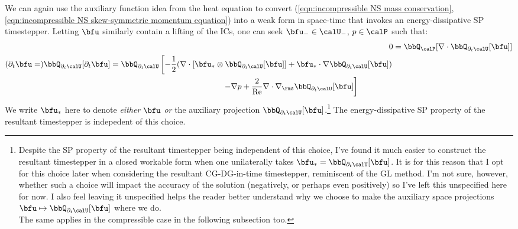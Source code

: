     We can again use the auxiliary function idea from the heat equation to convert (\ref{eqn:incompressible NS mass conservation}, \ref{eqn:incompressible NS skew-symmetric momentum equation}) into a weak form in space-time that invokes an energy-dissipative SP timestepper. Letting $\bfu$ similarly contain a lifting of the ICs, one can seek $\bfu_{-} \in \calU_{-}$, $p \in \calP$ such that:
    \begin{align}
            0
            &=
            \bbQ_{\calP}[\nabla\cdot\bbQ_{\partial_{t}\calU}[\bfu]]  \label{eqn:incompressible NS weak form 1}  \\
        \begin{split}
            (\partial_{t}\bfu
            =)
            \bbQ_{\partial_{t}\calU}[\partial_{t}\bfu]
            &=
            \bbQ_{\partial_{t}\calU}\left[- \frac{1}{2}(\nabla\cdot\left[\bfu_{*}\otimes\bbQ_{\partial_{t}\calU}[\bfu]\right]
            + \bfu_{*}\cdot\nabla\bbQ_{\partial_{t}\calU}[\bfu])\right.  \\
            &\qquad\qquad\qquad\qquad\qquad\qquad\qquad\left.- \nabla p
            + \frac{2}{\rmRe}\nabla\cdot\nabla_{\rms}\bbQ_{\partial_{t}\calU}[\bfu]\right]
        \end{split}  \label{eqn:incompressible NS weak form 2}
    \end{align}
    We write $\bfu_{*}$ here to denote \emph{either} $\bfu$ \emph{or} the auxiliary projection $\bbQ_{\partial_{t}\calU}[\bfu]$.\footnote{Despite the SP property of the resultant timestepper being independent of this choice, I've found it much easier to construct the resultant timestepper in a closed workable form when one unilaterally takes $\bfu_{*} = \bbQ_{\partial_{t}\calU}[\bfu]$. It is for this reason that I opt for this choice later when considering the resultant CG-DG-in-time timestepper, reminiscent of the GL method. I'm not sure, however, whether such a choice will impact the accuracy of the solution (negatively, or perhaps even positively) so I've left this unspecified here for now. I also feel leaving it unspecified helps the reader better understand why we choose to make the auxiliary space projections $\bfu \mapsto \bbQ_{\partial_{t}\calU}[\bfu]$ where we do. \\ The same applies in the compressible case in the following subsection too.} The energy-dissipative SP property of the resultant timestepper is indepedent of this choice.
    
    \shortline
    
